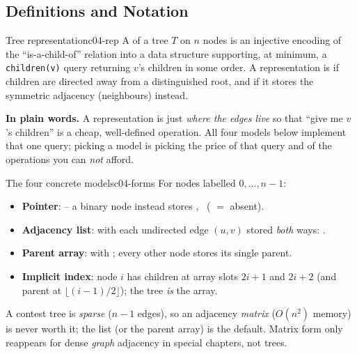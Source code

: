 \subsection{Definitions and Notation}

\begin{definition}{Tree representation}{c04-rep}
A  of a tree $T$ on $n$ nodes is an injective encoding of the
``is-a-child-of'' relation into a data structure supporting, at minimum, a
\texttt{children(v)} query returning $v$'s children in some order. A
representation is  if children are directed away from a distinguished root,
and  if it stores the symmetric adjacency (neighbours) instead.
\end{definition}

\noindent\textbf{In plain words.} A representation is just \emph{where the edges live} so
that ``give me $v$'s children'' is a cheap, well-defined operation. All
four models below implement that one query; picking a model is picking the price of that
query and of the operations you can \emph{not} afford.

\begin{definition}{The four concrete models}{c04-forms}
For nodes labelled $0,\dots,n-1$:
\begin{itemize}[nosep]
  \item \textbf{Pointer}:  -- a
        binary node instead stores ,\  ( $=$ absent).
  \item \textbf{Adjacency list}:  with each undirected edge
        $(u,v)$ stored \emph{both} ways: .
  \item \textbf{Parent array}:  with ; every other
        node stores its single parent.
  \item \textbf{Implicit index}: node $i$ has children at array slots $2i{+}1$ and
        $2i{+}2$ (and parent at $\lfloor (i-1)/2\rfloor$); the tree \emph{is} the array.
\end{itemize}
\end{definition}

\begin{notebox}
A contest tree is \emph{sparse} ($n-1$ edges), so an adjacency \emph{matrix} ($O(n^2)$
memory) is never worth it; the list (or the parent array) is the default. Matrix form
only reappears for dense \emph{graph} adjacency in special chapters, not trees.
\end{notebox}

